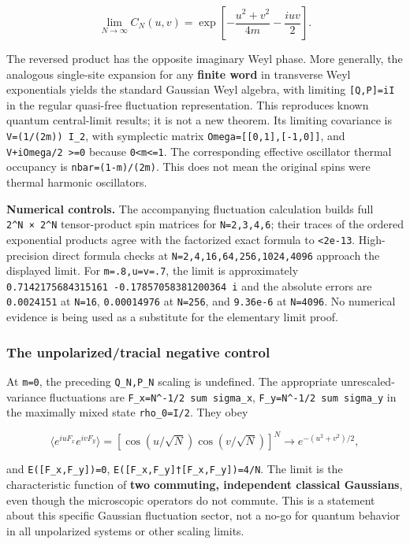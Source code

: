 \documentclass[
  10pt,
  a4paper,
]{article}
\begin{document}
\[
\lim_{N\to\infty}C_N(u,v)
=\exp\left[-\frac{u^2+v^2}{4m}-\frac{iuv}{2}\right].
\]

The reversed product has the opposite imaginary Weyl phase. More generally, the analogous single-site expansion for any \textbf{finite word} in transverse Weyl exponentials yields the standard Gaussian Weyl algebra, with limiting \texttt{{[}Q,P{]}=iI} in the regular quasi-free fluctuation representation. This reproduces known quantum central-limit results; it is not a new theorem. Its limiting covariance is \texttt{V=(1/(2m))\ I\_2}, with symplectic matrix \texttt{Omega={[}{[}0,1{]},{[}-1,0{]}{]}}, and \texttt{V+iOmega/2\ \textgreater{}=0} because \texttt{0\textless{}m\textless{}=1}. The corresponding effective oscillator thermal occupancy is \texttt{nbar=(1-m)/(2m)}. This does not mean the original spins were thermal harmonic oscillators.

\textbf{Numerical controls.} The accompanying fluctuation calculation builds full \texttt{2\^{}N\ ×\ 2\^{}N} tensor-product spin matrices for \texttt{N=2,3,4,6}; their traces of the ordered exponential products agree with the factorized exact formula to \texttt{\textless{}2e-13}. High-precision direct formula checks at \texttt{N=2,4,16,64,256,1024,4096} approach the displayed limit. For \texttt{m=.8,u=v=.7}, the limit is approximately \texttt{0.7142175684315161\ -0.17857058381200364\ i} and the absolute errors are \texttt{0.0024151} at \texttt{N=16}, \texttt{0.00014976} at \texttt{N=256}, and \texttt{9.36e-6} at \texttt{N=4096}. No numerical evidence is being used as a substitute for the elementary limit proof.

\subsubsection{The unpolarized/tracial negative control}\label{the-unpolarizedtracial-negative-control}

At \texttt{m=0}, the preceding \texttt{Q\_N,P\_N} scaling is undefined. The appropriate unrescaled-variance fluctuations are \texttt{F\_x=N\^{}-1/2\ sum\ sigma\_x}, \texttt{F\_y=N\^{}-1/2\ sum\ sigma\_y} in the maximally mixed state \texttt{rho\_0=I/2}. They obey

\[
\langle e^{iuF_x}e^{ivF_y}\rangle
=\left[\cos(u/\sqrt N)\cos(v/\sqrt N)\right]^N
\longrightarrow e^{-(u^2+v^2)/2},
\]

and \texttt{E({[}F\_x,F\_y{]})=0}, \texttt{E({[}F\_x,F\_y{]}†{[}F\_x,F\_y{]})=4/N}. The limit is the characteristic function of \textbf{two commuting, independent classical Gaussians}, even though the microscopic operators do not commute. This is a statement about this specific Gaussian fluctuation sector, not a no-go for quantum behavior in all unpolarized systems or other scaling limits.
\end{document}
